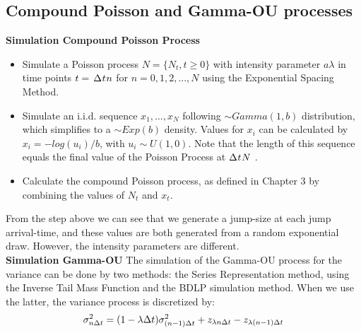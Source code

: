 
\subsection{Compound Poisson and Gamma-OU processes}

\textbf{Simulation Compound Poisson Process}\\
\begin{flushleft}
\begin{itemize}
        \item Simulate a Poisson process $N=\{N_{t},t\geq 0\}$ with intensity parameter $a\lambda$ in time points $t = \hspace{0.15em} \Delta \hspace{0.05em} t \hspace{0.05em} n$ for $n = 0,1,2,...,N$ using the Exponential Spacing Method.

        \item Simulate an i.i.d. sequence $x_1,...,x_N$ following $\sim Gamma(1,b)$ distribution, which simplifies to a $\sim Exp(b)$ density. Values for $x_i$ can be calculated by $x_{i}=-log(u_i)/b$, with $u_i \sim U(1,0)$. Note that the length of this sequence equals the final value of the Poisson Process at  $\Delta \hspace{0.05em} t \hspace{0.05em} N$ . 

        \item Calculate the compound Poisson process, as defined in Chapter 3 by combining the values of $N_{t}$ and $x_{t}$.

\end{itemize}
\end{flushleft}

From the step above we can see that we generate a jump-size at each jump arrival-time, and these values are both generated from a random exponential draw. However, the intensity parameters are different.\\


\textbf{Simulation Gamma-OU}
The simulation of the Gamma-OU process for the variance can be done by two methods: the Series Representation method, using the Inverse Tail Mass Function and the BDLP simulation method. When we use the latter, the variance process is discretized by:\\

\begin{equation}
\sigma_{n\Delta t}^2 = (1 - \lambda \Delta t) \sigma_{(n-1)\Delta t}^2 + z_{\lambda n \Delta t}-z_{\lambda (n-1)\Delta t} \notag\\
\label{eq:5-2 Gamma-OU discretization}
\end{equation}

